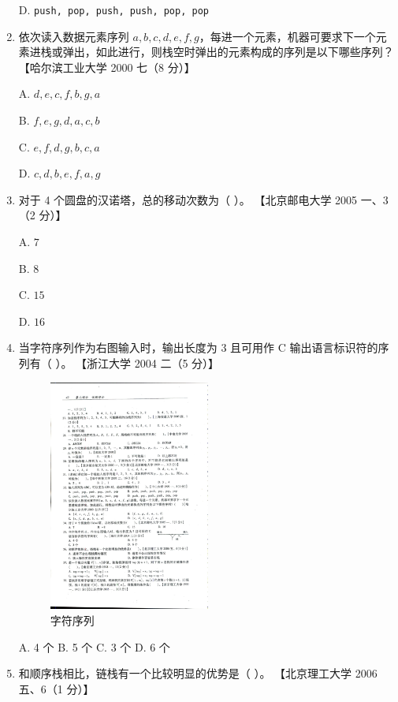 \documentclass[lang=cn,newtx,10pt,scheme=chinese]{../../elegantbook}
\begin{document}
\begin{enumerate}
    D. \texttt{push, pop, push, push, pop, pop}  

    \item 依次读入数据元素序列 $a, b, c, d, e,f,g$，每进一个元素，机器可要求下一个元素进栈或弹出，如此进行，则栈空时弹出的元素构成的序列是以下哪些序列？  
    【哈尔滨工业大学 2000 七（8 分）】 

    A. $d,e,c,f,b,g,a$  

    B. $f,e,g,d,a,c,b$  

    C. $e, f,d, g,b, c, a$  

    D. $c, d, b,e,f,a,g$  

    \item 对于 4 个圆盘的汉诺塔，总的移动次数为（ ）。  
    【北京邮电大学 2005 一、3（2 分）】  

    A. $7$  

    B. $8$  

    C. $15$  

    D. $16$  

    \item 当字符序列作为右图输入时，输出长度为 3 且可用作 C 输出语言标识符的序列有（ ）。  
    【浙江大学 2004 二（5 分）】  

    \begin{figure}[h!]
        \centering
        \includegraphics[width=0.5\textwidth]{../../figure/exercisePicPDF/chapter3/3-35.pdf}
        \caption{字符序列}
        \label{fig:linear_list_1}
    \end{figure}
    A. 4 个 \quad B. 5 个 \quad C. 3 个 \quad D. 6 个  

    \item 和顺序栈相比，链栈有一个比较明显的优势是（ ）。  
    【北京理工大学 2006 五、6（1 分）】


\end{enumerate}
\end{document}
